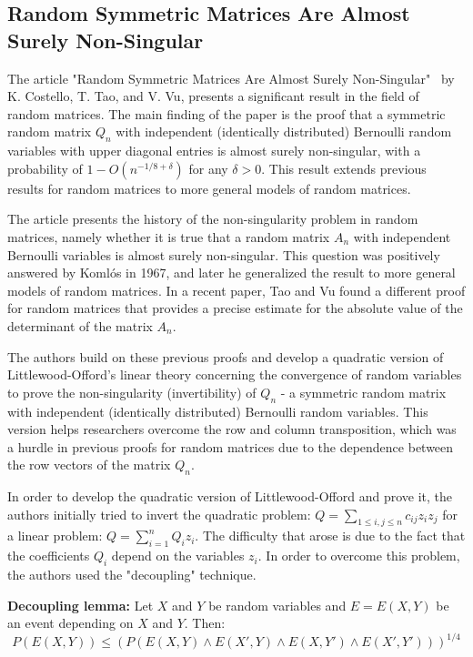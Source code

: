 
\subsection{Random Symmetric Matrices Are Almost Surely Non-Singular}


The article "Random Symmetric Matrices Are Almost Surely Non-Singular"~\cite{costello2005random} by K. Costello, T. Tao, and V. Vu, presents a significant result in the field of random matrices. The main finding of the paper is the proof that a symmetric random matrix \( Q_n \) with independent (identically distributed) Bernoulli random variables with upper diagonal entries is almost surely non-singular, with a probability of  \( 1-O(n^{-1/8+\delta}) \) for any \( \delta>0 \). This result extends previous results for random matrices to more general models of random matrices.

The article presents the history of the non-singularity problem in random matrices, namely whether it is true that a random matrix \( A_n \) with independent Bernoulli variables is almost surely non-singular. This question was positively answered by Komlós in 1967, and later he generalized the result to more general models of random matrices. In a recent paper, Tao and Vu found a different proof for random matrices that provides a precise estimate for the absolute value of the determinant of the matrix \( A_n \).

The authors build on these previous proofs and develop a quadratic version of Littlewood-Offord's linear theory concerning the convergence of random variables to prove the non-singularity (invertibility) of \(Q_n\) - a symmetric random matrix with independent (identically distributed) Bernoulli random variables. This version helps researchers overcome the row and column transposition, which was a hurdle in previous proofs for random matrices due to the dependence between the row vectors of the matrix \(Q_n\).

In order to develop the quadratic version of Littlewood-Offord and prove it, the authors initially tried to invert the quadratic problem: \( Q=\sum_{1\leq i,j\leq n} c_{ij} z_i z_j \) for a linear problem: \( Q=\sum_{i=1}^n Q_i z_i \). The difficulty that arose is due to the fact that the coefficients \( Q_i \) depend on the variables \( z_i \). In order to overcome this problem, the authors used the "decoupling" technique.
\vspace{\baselineskip}

\textbf{Decoupling lemma:} Let \(X\) and \(Y\) be random variables and \(E=E(X,Y)\) be an event depending on \(X\) and \(Y\). Then:
\[
P(E(X,Y)) \leq (P(E(X,Y) \land E(X',Y) \land E(X,Y') \land E(X',Y')))^{1/4}
\]

